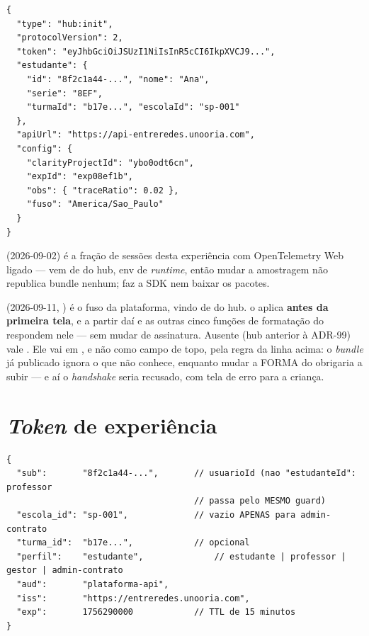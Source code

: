 \begin{lstlisting}[language=jsonunoo, caption={\cd{hub:init} --- o que a experiência recebe}]
{
  "type": "hub:init",
  "protocolVersion": 2,
  "token": "eyJhbGciOiJSUzI1NiIsInR5cCI6IkpXVCJ9...",
  "estudante": {
    "id": "8f2c1a44-...", "nome": "Ana",
    "serie": "8EF",
    "turmaId": "b17e...", "escolaId": "sp-001"
  },
  "apiUrl": "https://api-entreredes.unooria.com",
  "config": {
    "clarityProjectId": "ybo0odt6cn",
    "expId": "exp08ef1b",
    "obs": { "traceRatio": 0.02 },
    "fuso": "America/Sao_Paulo"
  }
}
\end{lstlisting}

 (2026-09-02) é a fração de sessões desta
experiência com OpenTelemetry Web ligado --- vem de
 do hub, env de \emph{runtime}, então mudar a
amostragem não republica bundle nenhum;  faz a SDK nem baixar os
pacotes.

 (2026-09-11, ) é o fuso da plataforma, vindo de
 do hub.  o aplica
\textbf{antes da primeira tela}, e a partir daí  e as outras cinco
funções de formatação do  respondem nele --- sem mudar de
assinatura. Ausente (hub anterior à ADR-99) vale .
Ele vai em , e não como campo de topo, pela regra da linha acima: o
\emph{bundle} já publicado ignora o que não conhece, enquanto mudar a FORMA do
 obrigaria a subir  --- e aí o
\emph{handshake} seria recusado, com tela de erro para a criança.

\section{\emph{Token} de experiência}

\begin{lstlisting}[language=jsonunoo, caption={\emph{Claims} do JWT --- contrato congelado}]
{
  "sub":       "8f2c1a44-...",       // usuarioId (nao "estudanteId": professor
                                     // passa pelo MESMO guard)
  "escola_id": "sp-001",             // vazio APENAS para admin-contrato
  "turma_id":  "b17e...",            // opcional
  "perfil":    "estudante",              // estudante | professor | gestor | admin-contrato
  "aud":       "plataforma-api",
  "iss":       "https://entreredes.unooria.com",
  "exp":       1756290000            // TTL de 15 minutos
}
\end{lstlisting}

